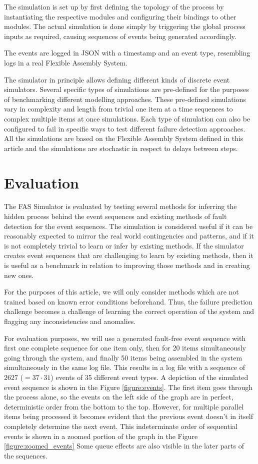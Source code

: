 \documentclass[journal]{IEEEtran}
\begin{document}
The simulation is set up by first defining the topology of the process by instantiating the respective modules and configuring their bindings to other modules. The actual simulation
is done simply by triggering the global process inputs as required, causing sequences of events being generated accordingly.

The events are logged in JSON with a timestamp and an event type, resembling logs in a real Flexible Assembly System.

The simulator in principle allows defining different kinds of discrete event simulators. Several specific types of simulations are pre-defined for the purposes of benchmarking
different modelling approaches. These pre-defined simulations vary in complexity and length from trivial one item at a time sequences to complex multiple items at once simulations.
Each type of simulation can also be configured to fail in specific ways to test different failure detection approaches. All the simulations are based on the Flexible Assembly System
defined in this article and the simulations are stochastic in respect to delays between steps.

\section{Evaluation}

The FAS Simulator is evaluated by testing several methods for inferring the hidden process behind the event sequences and existing methods of fault detection for
the event sequences.
The simulation is considered useful if it can be reasonably expected to mirror the real world contingencies and patterns, and if it is not completely trivial to
learn or infer by existing methods. If the simulator creates event sequences that are challenging to learn by existing methods, then it is useful as a benchmark
in relation to improving those methods and in creating new ones.

For the purposes of this article, we will only consider methods which are not trained based on known error conditions beforehand. Thus, the failure prediction challenge
becomes a challenge of learning the correct operation of the system and flagging any inconsistencies and anomalies.

For evaluation purposes, we will use a generated fault-free event sequence with first one complete sequence for one item only, then for 20 items simultaneously going through the system,
and finally 50 items being assembled in the system simultaneously in the same log file. This results in a log file with a sequence of 2627 ($ = 37 \cdot 31 $) events of 35 different
event types. A depiction of the simulated event sequence is shown in the Figure \ref{figure:events}. The first item goes through the process alone, so the events on the left side
of the graph are in perfect, deterministic order from the bottom to the top. However, for multiple parallel items being processed it becomes evident that the previous event doesn't in itself
completely determine the next event. This indeterminate order of sequential events is shown in a zoomed portion of the graph in the Figure \ref{figure:zoomed_events}
Some queue effects are also visible in the later parts of the sequences.
\end{document}
